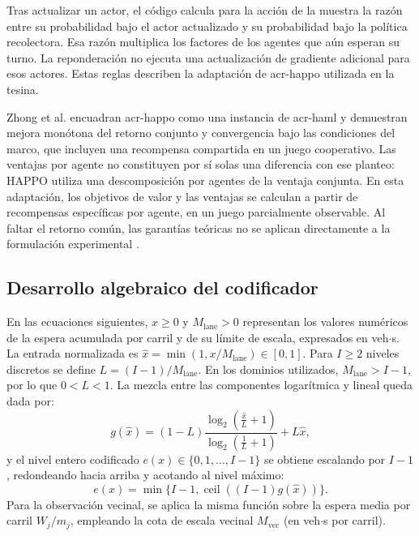 Tras actualizar un actor, el código calcula para la acción de la muestra la razón entre su probabilidad bajo el actor actualizado y su probabilidad bajo la política recolectora. Esa razón multiplica los factores de los agentes que aún esperan su turno. La reponderación no ejecuta una actualización de gradiente adicional para esos actores. Estas reglas describen la adaptación de \acrshort{acr-happo} utilizada en la tesina.

Zhong et al. encuadran \acrshort{acr-happo} como una instancia de \acrshort{acr-haml} y demuestran mejora monótona del retorno conjunto y convergencia bajo las condiciones del marco, que incluyen una recompensa compartida en un juego cooperativo. Las ventajas por agente no constituyen por sí solas una diferencia con ese planteo: HAPPO utiliza una descomposición por agentes de la ventaja conjunta. En esta adaptación, los objetivos de valor y las ventajas se calculan a partir de recompensas específicas por agente, en un juego parcialmente observable. Al faltar el retorno común, las garantías teóricas no se aplican directamente a la formulación experimental \cite{zhong2024heterogeneous}.

\subsection{Desarrollo algebraico del codificador}
\label{subsec:codificacion_espera_apendice}

En las ecuaciones siguientes, $x \ge 0$ y $M_{\mathrm{lane}} > 0$ representan los valores numéricos de la espera acumulada por carril y de su límite de escala, expresados en veh$\cdot$s. La entrada normalizada es $\hat{x} = \min(1, x / M_{\mathrm{lane}}) \in [0, 1]$. Para $I \ge 2$ niveles discretos se define $L = (I - 1) / M_{\mathrm{lane}}$. En los dominios utilizados, $M_{\mathrm{lane}} > I-1$, por lo que $0 < L < 1$. La mezcla entre las componentes logarítmica y lineal queda dada por:
\begin{equation}
    g(\hat{x}) = (1 - L) \frac{\log_2\left(\frac{\hat{x}}{L} + 1\right)}{\log_2\left(\frac{1}{L} + 1\right)} + L \hat{x},
    \label{eq:encoder_mezcla_convexa}
\end{equation}
y el nivel entero codificado $e(x) \in \{0, 1, \ldots, I-1\}$ se obtiene escalando por $I-1$, redondeando hacia arriba y acotando al nivel máximo:
\begin{equation}
e(x)=\min\{I-1,\operatorname{ceil}((I-1)g(\hat{x}))\}.
\label{eq:encoder_saturacion}
\end{equation}
Para la observación vecinal, se aplica la misma función sobre la espera media por carril $W_j / m_j$, empleando la cota de escala vecinal $M_{\mathrm{vec}}$ (en veh$\cdot$s por carril).


